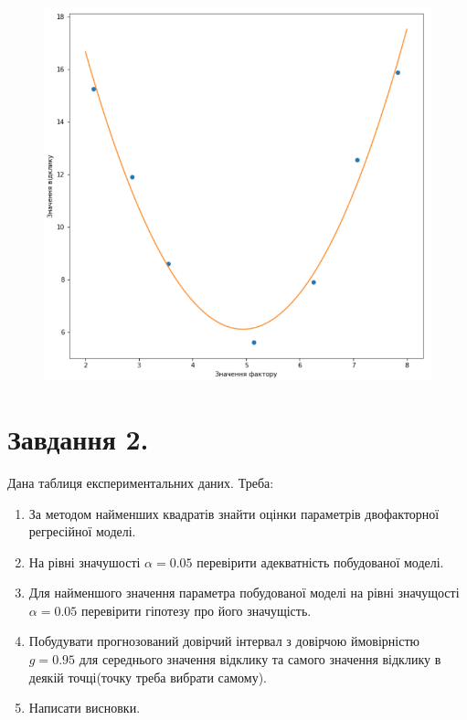 \documentclass[a5paper, 20pt]{article}
\begin{document}
\begin{figure}[h]
\centering
\includegraphics[scale=0.54]{plot_for_first_task_2}
\end{figure}

\newpage{}



\section{Завдання 2.}

Дана таблиця експериментальних даних.
Треба:

\begin{enumerate}
\item За методом найменших квадратів знайти оцінки параметрів двофакторної регресійної моделі.

\item На рівні значушості $\alpha = 0.05$ перевірити адекватність побудованої моделі. 

\item Для найменшого значення параметра побудованої моделі на рівні значущості $ \alpha = 0.05$ перевірити гіпотезу про його значущість. 

\item Побудувати прогнозований довірчий інтервал з довірчою ймовірністю $g = 0.95$ для середнього значення відклику та самого значення відклику в деякій точці(точку треба вибрати самому).

\item Написати висновки.
\end{enumerate}
\end{document}
